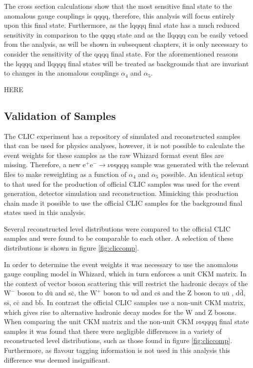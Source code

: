 The cross section calculations show that the most sensitive final state to the anomalous gauge couplings is \nu{\nu}qqqq, therefore, this analysis will focus entirely upon this final state.  Furthermore, as the l{\nu}qqqq final state has a much reduced sensitivity in comparison to the \nu{\nu}qqqq state and as the llqqqq can be easily vetoed from the analysis, as will be shown in subsequent chapters, it is only necessary to consider the sensitivity of the \nu{\nu}qqqq final state.  For the aforementioned reasons the l{\nu}qqqq and llqqqq final states will be treated as backgrounds that are invariant to changes in the anomalous couplings $\alpha_{4}$ and $\alpha_{5}$.  



HERE



\subsection{Validation of Samples}
\label{sec:validationofsamples}
The CLIC experiment has a repository of simulated and reconstructed samples that can be used for physics analyses, however, it is not possible to calculate the event weights for these samples as the raw Whizard format event files are missing.  Therefore, a new $\text{e}^{+}\text{e}^{-} \rightarrow \nu\nu\text{qqqq}$ sample was generated with the relevant files to make reweighting as a function of $\alpha_{4}$ and $\alpha_{5}$ possible.  An identical setup to that used for the production of official CLIC samples was used for the event generation, detector simulation and reconstruction.  Mimicking this production chain made it possible to use the official CLIC samples for the background final states used in this analysis.  

Several reconstructed level distributions were compared to the official CLIC samples and were found to be comparable to each other. A selection of these distributions is shown in figure \ref{fig:cliccomp}.

In order to determine the event weights it was necessary to use the anomalous gauge coupling model in Whizard, which in turn enforces a unit CKM matrix.  In the context of vector boson scattering this will restrict the hadronic decays of the $\text{W}^{-}$ boson to d$\bar{\text{u}}$ and s$\bar{\text{c}}$, the $\text{W}^{+}$ boson to u$\bar{\text{d}}$ and c$\bar{\text{s}}$ and the Z boson to u$\bar{\text{u}}$ , d$\bar{\text{d}}$, s$\bar{\text{s}}$, c$\bar{\text{c}}$ and b$\bar{\text{b}}$.  In contrast the official CLIC samples use a non-unit CKM matrix, which gives rise to alternative hadronic decay modes for the W and Z bosons.  When comparing the unit CKM matrix and the non-unit CKM $\nu\nu\text{qqqq}$ final state samples it was found that there were negligible differences in a variety of reconstructed level distributions, such as those found in figure \ref{fig:cliccomp}.  Furthermore, as flavour tagging information is not used in this analysis this difference was deemed insignificant.  

